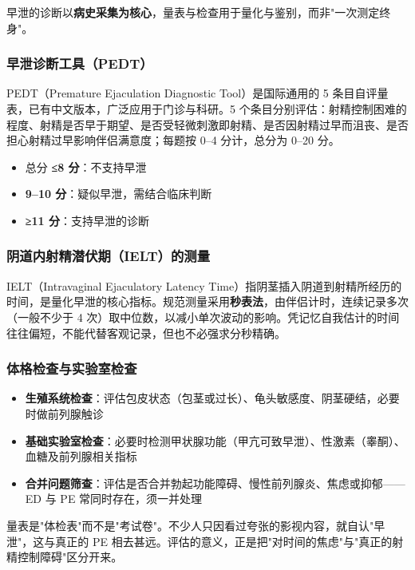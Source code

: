 早泄的诊断以\textbf{病史采集为核心}，量表与检查用于量化与鉴别，而非"一次测定终身"。

\subsubsection{早泄诊断工具（PEDT）}

PEDT（Premature Ejaculation Diagnostic Tool）是国际通用的 5 条目自评量表，已有中文版本，广泛应用于门诊与科研。5 个条目分别评估：射精控制困难的程度、射精是否早于期望、是否受轻微刺激即射精、是否因射精过早而沮丧、是否担心射精过早影响伴侣满意度；每题按 0--4 分计，总分为 0--20 分。

\begin{itemize}
	\item 总分 \textbf{≤8 分}：不支持早泄
	\item \textbf{9--10 分}：疑似早泄，需结合临床判断
	\item \textbf{≥11 分}：支持早泄的诊断
\end{itemize}

\subsubsection{阴道内射精潜伏期（IELT）的测量}

IELT（Intravaginal Ejaculatory Latency Time）指阴茎插入阴道到射精所经历的时间，是量化早泄的核心指标。规范测量采用\textbf{秒表法}，由伴侣计时，连续记录多次（一般不少于 4 次）取中位数，以减小单次波动的影响。凭记忆自我估计的时间往往偏短，不能代替客观记录，但也不必强求分秒精确。

\subsubsection{体格检查与实验室检查}

\begin{itemize}
	\item \textbf{生殖系统检查}：评估包皮状态（包茎或过长）、龟头敏感度、阴茎硬结，必要时做前列腺触诊
	\item \textbf{基础实验室检查}：必要时检测甲状腺功能（甲亢可致早泄）、性激素（睾酮）、血糖及前列腺相关指标
	\item \textbf{合并问题筛查}：评估是否合并勃起功能障碍、慢性前列腺炎、焦虑或抑郁——ED 与 PE 常同时存在，须一并处理
\end{itemize}

\begin{tcolorbox}[colback=pink!5!white,colframe=red!50!black,title=贴心小叮咛]
量表是"体检表"而不是"考试卷"。不少人只因看过夸张的影视内容，就自认"早泄"，这与真正的 PE 相去甚远。评估的意义，正是把"对时间的焦虑"与"真正的射精控制障碍"区分开来。
\end{tcolorbox}


